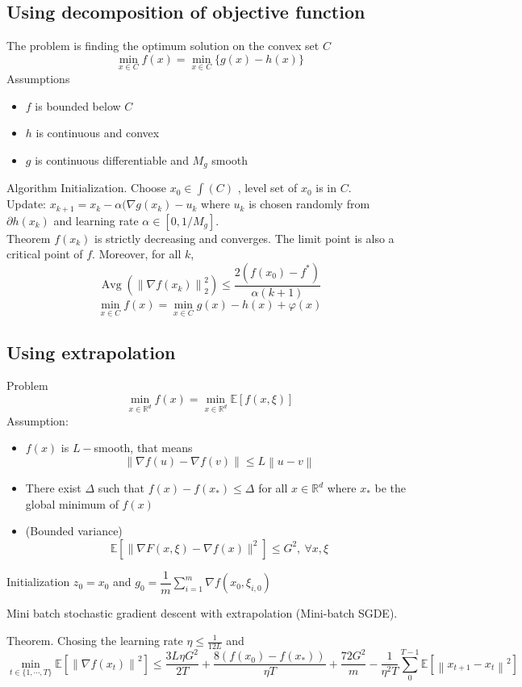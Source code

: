 \documentclass{article}
\DeclareMathOperator{\Avg}{Avg}
\theoremstyle{theorem}
\theoremstyle{definition}
\begin{document}
 \subsection{Using decomposition of objective function}
 The problem is finding the optimum solution on the convex set $C$
 $$\min_{x \in C} f(x) = \min_{x \in C} \{ g(x)-h(x) \} $$
 Assumptions
 \begin{itemize}
 	\item $f$ is bounded below $C$
 	\item $h$ is continuous and convex
 	\item $g$ is continuous differentiable and $M_g$ smooth
 \end{itemize}
Algorithm
Initialization. Choose $x_0 \in \int(C)$ , level set of $x_0$ is in $C$.\\
Update: $x_{k+1}=x_{k} -\alpha (\nabla g(x_k)-u_k$ where $u_k$ is chosen randomly from $\partial h(x_k)$ and learning rate $\alpha \in \left[0, 1/M_g\right]$.\\
Theorem 
$f(x_k)$ is strictly decreasing and converges. The limit point is also a critical point of $f$. Moreover, for all $k$, $$\Avg \left(\left\|\nabla f(x_k)\right\|^2_2 \right) \leq \frac{2(f(x_0)-f^{*})}{\alpha (k+1)}$$
$$\min_{x \in C} f(x) = \min_{x \in C} g(x)-h(x)+ \varphi(x)$$
\subsection{Using extrapolation}
Problem $$\min_{x \in \mathbb{R}^d} f(x) = \min_{x \in  \mathbb{R}^d}  \mathbb{E}\left[f\left(x, \xi\right)\right]  $$
Assumption: \begin{itemize}
	\item $f(x)$ is $L-$smooth, that means  $$\left\|\nabla f(u)-\nabla f(v) \right\| \leq L \left \| u-v \right\|$$
	\item There exist $\Delta$ such that $f(x)-f(x_*) \leq \Delta$ for all $x \in \mathbb{R}^d$ where $x_*$ be the global minimum of $f(x)$
	\item (Bounded variance) $$\mathbb{E} \left[\| \nabla F(x, \xi)-\nabla f(x)\| ^2\right] \le G^2, \ \forall x, \xi $$	
\end{itemize}
\begin{algorithm}[H]
	\SetAlgoLined
	Initialization $z_0=x_0$ and $g_0=\dfrac{1}{m} \sum_{i=1}^{m} \nabla f(x_0, \xi_{i,0})$\;
	\caption{Mini batch stochastic gradient descent with extrapolation (Mini-batch SGDE).}
\end{algorithm}
Theorem. Chosing the learning rate $\eta \le \frac{1}{12L}$ and 
$$\min_{t \in \{1, \cdots, T\}} \mathbb{E} \left[ \left\|\nabla f(x_t)\right\|^2 \right] \leq \dfrac{3L\eta G^2}{2T} +\dfrac{8(f(x_0)-f(x_*))}{\eta T}+\dfrac{72G^2}{m}-\dfrac{1}{\eta^2T} \sum_{0}^{T-1} \mathbb{E}\left[\left\|x_{t+1}-x_{t}\right\|^2\right]$$
\end{document}

